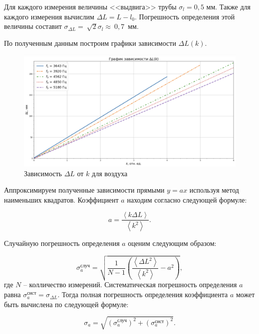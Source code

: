 \documentclass[a4paper,12pt]{article}
\theoremstyle{definition}
\begin{document}
	Для каждого измерения величины <<выдвига>> трубы $ \sigma_l = 0,5 $ мм. Также для каждого измерения вычислим $ \Delta L = L - l_0 $. Погрешность определения этой величины составит $ \sigma_{\Delta L}=~\sqrt{2}\sigma_l \approx~0,7 $~мм.
	
	По полученным данным построим графики зависимости $ \Delta L(k) $.
	
	\begin{figure}[h!]
		\centering
		\includegraphics[scale=0.542]{graph1}
		\caption{Зависимость $ \Delta L $ от $ k $ для воздуха}
		\label{graph1}
	\end{figure}
	
	Аппроксимируем полученные зависимости прямыми $ y=ax $ используя метод наименьших квадратов. Коэффициент $ a $ находим согласно следующей формуле:
	
	\begin{equation}\label{mnk:a}
		a=\frac{\left\langle k\Delta L \right\rangle}{\left\langle k^2 \right\rangle}.
	\end{equation}
	

	
	Случайную погрешность определения $ a $ оценим следующим образом:
	
	\begin{equation}\label{mnk:sigma_a}
		\sigma^\text{случ}_a=\sqrt{\frac{1}{N-1}\left(\frac{\left\langle \Delta L^2 \right\rangle}{\left\langle k^2 \right\rangle}-a^2\right)},
	\end{equation}
	где $ N $ -- колличество измерений. Систематическая погрешность определения $ a $ равна $ \sigma_a^\text{сист} = \sigma_{\Delta L} $. Тогда полная погрешность определения коэффициента $ a $ может быть вычислена по следующей формуле:
	
	\begin{equation}\label{mnk:full_sigma}
		\sigma_a=\sqrt{\left(\sigma^\text{случ}_a\right)^2+\left(\sigma^\text{сист}_a\right)^2}.
	\end{equation}
	
\end{document}
